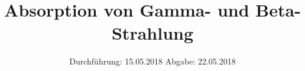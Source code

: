 

\subject{704}
\title{Absorption von Gamma- und Beta-Strahlung}
\date{%
  Durchführung: 15.05.2018
  \hspace{3em}
  Abgabe: 22.05.2018
}



\maketitle
\thispagestyle{empty}
\tableofcontents
\newpage






\printbibliography{}


